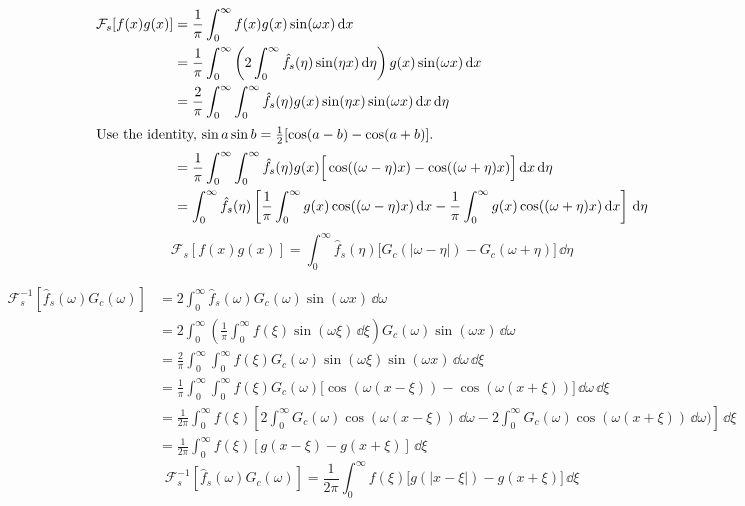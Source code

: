 {%
\begin{Solution}
  \label{solution ode ft sine convolution}
  \begin{align*}
    \mathcal{F}_s[f(x)g(x)]
    &= \frac{1}{\pi} \int_0^\infty f(x) g(x) \sin(\omega x)\,\mathrm{d} x \\
    &= \frac{1}{\pi} \int_0^\infty \left( 2 \int_0^\infty \hat{f}_s(\eta)\sin(\eta x)\,\mathrm{d} \eta
    \right) g(x) \sin(\omega x)\,\mathrm{d} x \\
    &= \frac{2}{\pi} \int_0^\infty \int_0^\infty \hat{f}_s(\eta) g(x) \sin(\eta x)
    \sin(\omega x)\,\mathrm{d} x\,\mathrm{d} \eta \\
    \intertext{Use the identity, $\sin a \sin b = \frac{1}{2}[\cos(a-b) - 
      \cos(a+b)]$.}
    &= \frac{1}{\pi} \int_0^\infty \int_0^\infty \hat{f}_s(\eta) g(x) \Big[\cos((\omega-\eta)x)
    - \cos((\omega+\eta)x)\Big]\,\mathrm{d} x\,\mathrm{d} \eta \\
    &= \int_0^\infty \hat{f}_s(\eta) \left[ \frac{1}{\pi} \int_0^\infty g(x) 
      \cos((\omega-\eta)x)\,\mathrm{d} x - \frac{1}{\pi} \int_0^\infty g(x)
      \cos((\omega+\eta)x)\,\mathrm{d} x \right]\,\mathrm{d} \eta 
  \end{align*}
  \[ \boxed{ \mathcal{F}_s[f(x)g(x)] = \int_0^\infty \hat{f}_s(\eta) \big[ 
    G_c(|\omega-\eta|) - G_c(\omega+\eta) \big]\,\dd \eta } \]
\end{Solution}





\begin{Solution}
  \label{solution ode ft inverse sine convolution}
  \begin{align*}
    \mathcal{F}_s^{-1}[\hat{f}_s(\omega) G_c(\omega)] 
    &= 2 \int_0^\infty \hat{f}_s(\omega) G_c(\omega) \sin(\omega x)\,\dd \omega \\
    &= 2 \int_0^\infty \left( \frac{1}{\pi} \int_0^\infty f(\xi) \sin(\omega \xi)\,\dd \xi
    \right) G_c(\omega) \sin(\omega x)\,\dd \omega \\
    &= \frac{2}{\pi} \int_0^\infty \int_0^\infty f(\xi) G_c(\omega) \sin(\omega \xi)
    \sin(\omega x)\,\dd \omega\,\dd \xi \\
    &= \frac{1}{\pi} \int_0^\infty \int_0^\infty f(\xi) G_c(\omega) 
    \Big[\cos(\omega(x-\xi))
    - \cos(\omega(x+\xi))\Big]\,\dd \omega\,\dd \xi \\
    &= \frac{1}{2\pi} \int_0^\infty f(\xi) \left[ 2\int_0^\infty G_c(\omega)
      \cos(\omega(x-\xi))\,\dd \omega - 2\int_0^\infty G_c(\omega)
      \cos(\omega(x+\xi))\,\dd \omega) \right]\,\dd \xi \\
    &= \frac{1}{2\pi} \int_0^\infty f(\xi) [g(x-\xi) - g(x+\xi)]\,\dd \xi
  \end{align*}
  \[ \boxed{ \mathcal{F}_s^{-1}[\hat{f}_s(\omega) G_c(\omega)] 
    = \frac{1}{2\pi} \int_0^\infty f(\xi) \big[g(|x-\xi|) - g(x+\xi)
    \big]\,\dd \xi } \]
\end{Solution}








}
